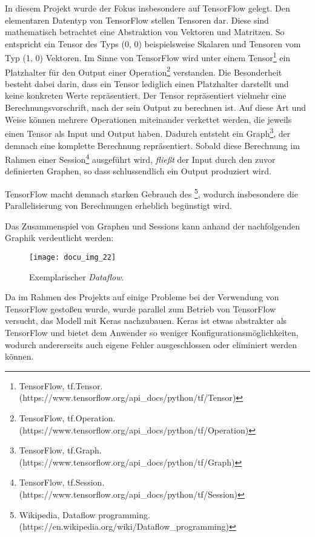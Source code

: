 In diesem Projekt wurde der Fokus insbesondere auf TensorFlow gelegt. Den elementaren Datentyp von TensorFlow stellen
Tensoren dar. Diese sind mathematisch betrachtet eine Abstraktion von Vektoren und Matritzen. So entspricht ein Tensor
des Typs (0, 0) beispielsweise Skalaren und Tensoren vom Typ (1, 0) Vektoren.
Im Sinne von TensorFlow wird unter einem Tensor\footnote{TensorFlow, tf.Tensor.\newline(https://www.tensorflow.org/api_docs/python/tf/Tensor)}
ein Platzhalter für den Output einer Operation\footnote{TensorFlow, tf.Operation.\newline(https://www.tensorflow.org/api_docs/python/tf/Operation)} verstanden.
Die Besonderheit besteht dabei darin, dass ein Tensor lediglich einen Platzhalter darstellt und keine konkreten Werte
repräsentiert. Der Tensor repräsentiert vielmehr eine Berechnungsvorschrift, nach der sein Output zu berechnen ist.
Auf diese Art und Weise können mehrere Operationen miteinander verkettet werden, die jeweils einen Tensor als Input und
Output haben. Dadurch entsteht ein Graph\footnote{TensorFlow, tf.Graph.\newline(https://www.tensorflow.org/api_docs/python/tf/Graph)},
der demnach eine komplette Berechnung repräsentiert. Sobald diese Berechnung im Rahmen einer Session\footnote{TensorFlow, tf.Session.\newline(https://www.tensorflow.org/api_docs/python/tf/Session)}
ausgeführt wird, \textit{fließt} der Input durch den zuvor definierten Graphen, so dass schlussendlich ein Output
produziert wird.

TensorFlow macht demnach starken Gebrauch des \footnote{Wikipedia, Dataflow programming.\newline(https://en.wikipedia.org/wiki/Dataflow_programming)},
wodurch insbesondere die Parallelisierung von Berechnungen erheblich begünstigt wird.

Das Zusammenspiel von Graphen und Sessions kann anhand der nachfolgenden Graphik verdeutlicht werden:

\begin{figure}[h]
    \centering
    \texttt{[image: docu\_img\_22]}
    \caption{Exemplarischer \textit{Dataflow}.}
    \label{fig:tf-api}
\end{figure}

Da im Rahmen des Projekts auf einige Probleme bei der Verwendung von TensorFlow gestoßen wurde, wurde parallel zum
Betrieb von TensorFlow versucht, das Modell mit Keras nachzubauen. Keras ist etwas abstrakter als TensorFlow und bietet
dem Anwender so weniger Konfigurationsmöglichkeiten, wodurch andererseits auch eigene Fehler ausgeschlossen oder eliminiert
werden können.

